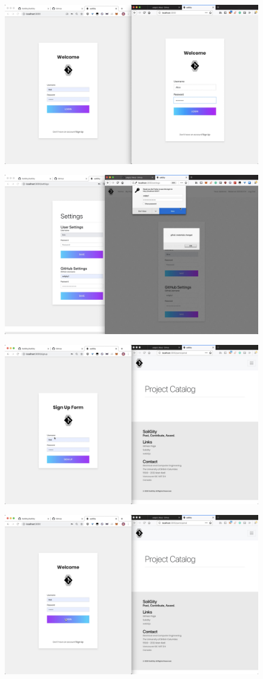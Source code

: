 \documentclass[12pt]{article}
\renewcommand{\_}{\kern-1.5pt\textunderscore\kern-1.5pt}
\begin{document}
\includegraphics[height=7cm]{graphs/16. alice_login}

\includegraphics[height=7cm]{graphs/17. alice_gitub_setup}

\includegraphics[height=7cm]{graphs/18. bob_sign_up}

\includegraphics[height=7cm]{graphs/19. bob_login}
\end{document}
